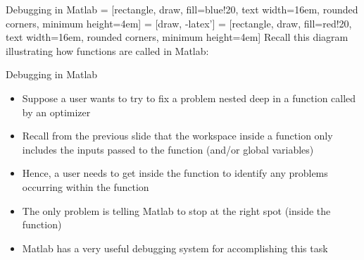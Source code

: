 \documentclass[english,xcolor=dvipsnames]{beamer}
\begin{document}
\begin{frame}{Debugging in Matlab}
 = [rectangle, draw, fill=blue!20, 
    text width=16em, rounded corners, minimum height=4em]
 = [draw, -latex']
 = [rectangle, draw, fill=red!20, 
    text width=16em, rounded corners, minimum height=4em]
Recall this diagram illustrating how functions are called in Matlab:
\end{frame}

\begin{frame}[fragile]{Debugging in Matlab}
\begin{itemize}
	\item Suppose a user wants to try to fix a problem nested deep in a function called by an optimizer
	\item Recall from the previous slide that the workspace inside a function only includes the inputs passed to the function (and/or global variables)
	\item Hence, a user needs to get inside the function to identify any problems occurring within the function
	\item The only problem is telling Matlab to stop at the right spot (inside the function)
	\item Matlab has a very useful debugging system for accomplishing this task
\end{itemize}
\end{frame}
\end{document}
